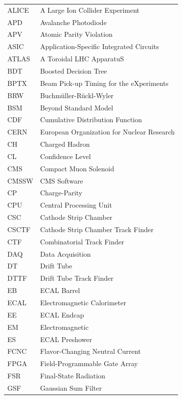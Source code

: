 \documentclass[12pt]{thesis}  %
\begin{document}
\begin{longtable}[l]{@{}l@{\ \ \ \ \ \ \ \ \ \ \ \ }l}
ALICE      & A Large Ion Collider Experiment \\
APD        & Avalanche Photodiode \\
APV        & Atomic Parity Violation \\
ASIC       & Application-Specific Integrated Circuits \\
ATLAS      & A Toroidal LHC ApparatuS \\
BDT        & Boosted Decision Tree \\
BPTX       & Beam Pick-up Timing for the eXperiments \\
BRW        & Buchm\"{u}ller-R\"{u}ckl-Wyler \\
BSM        & Beyond Standard Model \\
CDF        & Cumulative Distribution Function \\
CERN       & European Organization for Nuclear Research \\
CH         & Charged Hadron \\
CL         & Confidence Level \\
CMS        & Compact Muon Solenoid \\
CMSSW      & CMS Software \\
CP         & Charge-Parity \\
CPU        & Central Processing Unit \\
CSC        & Cathode Strip Chamber \\
CSCTF      & Cathode Strip Chamber Track Finder \\
CTF        & Combinatorial Track Finder \\
DAQ        & Data Acquisition \\
DT         & Drift Tube \\
DTTF       & Drift Tube Track Finder \\
EB         & ECAL Barrel \\
ECAL       & Electromagnetic Calorimeter \\
EE         & ECAL Endcap \\
EM         & Electromagnetic \\
ES         & ECAL Preshower \\
FCNC       & Flavor-Changing Neutral Current \\
FPGA       & Field-Programmable Gate Array \\
FSR        & Final-State Radiation \\
GSF        & Gaussian Sum Filter \\

\end{longtable}
\end{document}
